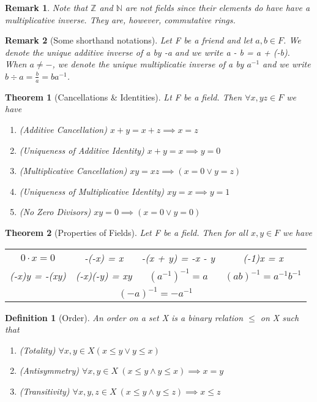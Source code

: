 \documentclass[11pt, oneside]{book}
\theoremstyle{break}
\newtheorem{thm}{Theorem}[section]
\newtheorem*{remark}{Remark}
\newtheorem{defn}{Definition}[section]
\newcommand{\bb}[1]{\mathbb{#1}}			%
\begin{document}
\begin{remark}
	Note that $\bb{Z}$ and $\bb{N}$ are not fields since their elements do have have a multiplicative inverse. They are, however, commutative rings.
\end{remark}

\begin{remark}[Some shorthand notations]
	Let F be a friend and let $a ,b \in F$. We denote the unique additive inverse of a by -a and we write a - b = a + (-b). When $a \neq -$, we denote the unique multiplicatie inverse of a by $a^{-1}$ and we write $b \div a = \frac{b}{a} = ba^{-1}$.
\end{remark}

\begin{thm}[Cancellations \& Identities]
	Lt F be a field. Then $\forall x, y z \in F$ we have
	\begin{enumerate}
		\item (Additive Cancellation) $x + y = x + z \implies x = z$
		\item (Uniqueness of Additive Identity) $x + y = x \implies y = 0$
		\item (Multiplicative Cancellation) $xy = xz \implies (x = 0 \lor y = z)$
		\item (Uniqueness of Multiplicative Identity) $xy = x \implies y = 1$
		\item (No Zero Divisors) $xy = 0 \implies (x = 0 \lor y = 0)$
	\end{enumerate}
\end{thm}

\begin{thm}[Properties of Fields]
	Let F be a field. Then for all $x, y \in F$ we have
	\begin{center}
		\begin{tabular}{c c c c}
			$0 \cdot x = 0$	&	-(-x) = x 	&	-(x + y) = -x - y 	&	(-1)x = x \\
			(-x)y = -(xy) &	(-x)(-y) = xy &	$(a^{-1})^{-1} = a$	&	$(ab)^{-1} = a^{-1}b^{-1}$ \\
			\multicolumn{4}{c}{$(-a)^{-1} = -a^{-1}$}
		\end{tabular}
	\end{center}
\end{thm}

\begin{defn}[Order]
	An order on a set X is a binary relation $\leq$ on X such that
	\begin{enumerate}
		\item (Totality) $\forall x, y \in X (x \leq y \lor y \leq x)$
		\item (Antisymmetry) $\forall x, y \in X \> (x \leq y \land y \leq x) \implies x = y$
		\item (Transitivity) $\forall x, y, z \in X \> (x \leq y \land y \leq z) \implies x \leq z$
	\end{enumerate}
\end{defn}
\end{document}
